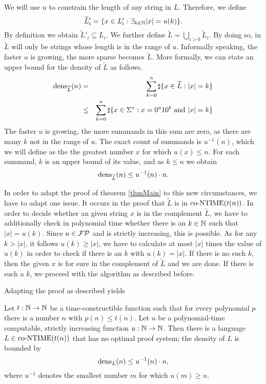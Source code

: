   We will use \(u\) to constrain the length of any string in \(L\). Therefore, we define
  \[
    \widetilde{L}'_i = \{ x \in L'_i : \exists_{k \in \mathbb{N}} |x| = u(k) \}. 
  \]
  By definition we obtain \(\widetilde{L}'_i \subseteq L_i\). We further define \(\widetilde{L} = \bigcup_{i>0} \widetilde{L}_i\). By doing so, in \(\widetilde{L}\) will only be strings whose length is in the range of \(u\). Informally speaking, the faster \(u\) is growing, the more sparse becomes \(\widetilde{L}\). More formally, we can state an upper bound for the density of \(\widetilde{L}\) as follows.
  \begin{eqnarray*}
    \operatorname{dens}_{\widetilde{L}}(n) 
    &=& \sum_{k=0}^n \sharp \{ x \in \widetilde{L} : |x| = k \} \\
    &\leq& \sum_{k=0}^n \sharp \{ x \in \Sigma^* : x = 0^a10^b \text{ and } |x| = k \} \\
  \end{eqnarray*}
  The faster \(u\) is growing, the more summands in this sum are zero, as there are many \(k\) not in the range of \(u\). The exact count of summands is \(u^{-1}(n)\), which we will define as the the greatest number \(x\) for which \(u(x) \leq n\). For each summand, \(k\) is an upper bound of its value, and as \(k \leq n\) we obtain 
  \[
   \operatorname{dens}_{\widetilde{L}}(n) \leq u^{-1}(n) \cdot n.
  \]

  In order to adapt the proof of theorem \ref{thmMain} to this new circumstances, we have to adapt one issue. It occurs in the proof that \(\widetilde{L}\) is in \(\text{co-NTIME}(t(n))\). In order to decide whether an given string \(x\) is in the complement \(\widetilde{L}\), we have to additionally check in polynomial time whether there is an \(k \in \mathbb{N}\) such that \(|x| = u(k)\). Since \(u \in \mathcal{FP}\) and is strictly increasing, this is possible. As for any \(k > |x|\), it follows \(u(k) \geq |x|\), we have to calculate at most \(|x|\) times the value of \(u(k)\) in order to check if there is an \(k\) with \(u(k) = |x|\). If there is no such \(k\), then the given \(x\) is for sure in the complement of \(\widetilde{L}\) and we are done. If there is such a \(k\), we proceed with the algorithm as described before.

  Adapting the proof as described yields
  
  \begin{corollary} \label{corSparse}
    Let \(t:\mathbb{N}\to\mathbb{N}\) be a time-constructible function such that for every polynomial \(p\) there is a number \(n\) with \(p(n) \leq t(n)\). Let \(u\) be a polynomial-time computable, strictly increasing function \(u:\mathbb{N}\to\mathbb{N}\). Then there is a language \(L \in \text{co-NTIME}(t(n))\) that has no optimal proof system; the density of \(L\) is bounded by 
    \[
     \operatorname{dens}_L(n) \leq u^{-1}(n) \cdot n,
    \]
    where \(u^{-1}\) denotes the smallest number \(m\) for which \(u(m) \geq n\).
  \end{corollary}


